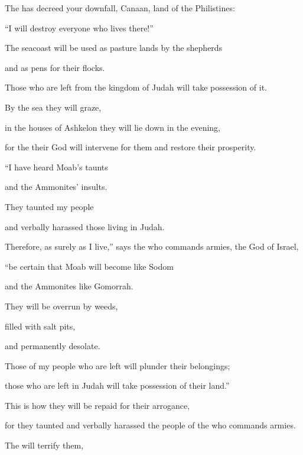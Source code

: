 {\par }{\Q The
{}
has decreed your downfall, Canaan,
land
of the Philistines:
\par }{\Q “I will destroy
everyone who lives there!”
\par }{\Q {}The seacoast
will be
used as pasture
lands
by the shepherds
\par }{\Q and as pens
for their flocks.
\par }{\Q {}Those who are left
from the kingdom
of Judah
will take possession
of it.

\par }{\Q By the sea they will graze,
\par }{\Q in the houses
of Ashkelon
they will lie
down in the evening,
\par }{\Q for
the {}
their God
will intervene
for them
and restore their prosperity.
\par }{\Q {}“I have heard
Moab’s
taunts
\par }{\Q and the Ammonites’
insults.
\par }{\Q They taunted
my people
\par }{\Q and verbally harassed
those living in
Judah.
\par }{\Q {}Therefore,
as surely as I
live,”
says
the {}
who commands armies,
the God
of Israel,
\par }{\Q “be certain that
Moab
will become
like Sodom
\par }{\Q and the Ammonites
like Gomorrah.
\par }{\Q They will be overrun
by weeds,
\par }{\Q filled with salt
pits,
\par }{\Q and permanently
desolate.
\par }{\Q Those of my people
who are left
will plunder
their belongings;

\par }{\Q those who are left
in Judah
will take possession of their land.”
\par }{\Q {}This
is how they
will be repaid
for their arrogance,
\par }{\Q for
they taunted
and verbally harassed
the people
of the
{}
who commands armies.
\par }{\Q {}The
{}
will terrify
them,

}
